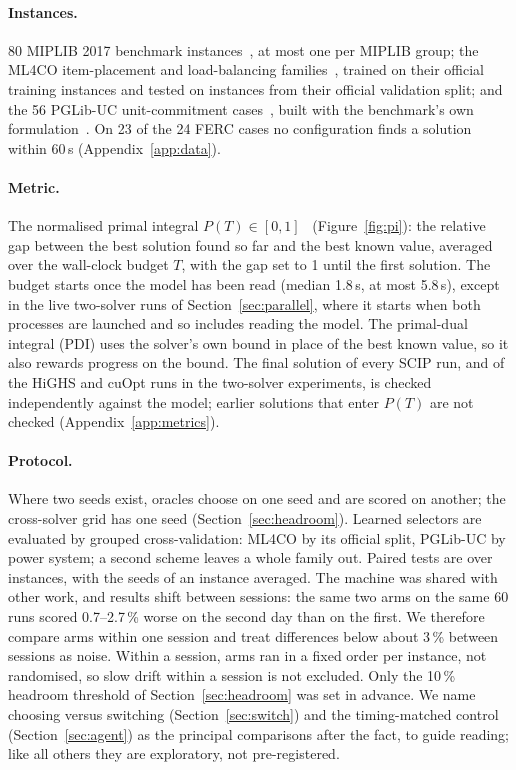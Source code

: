 \documentclass[11pt]{article}
\begin{document}
\paragraph{Instances.} 80 MIPLIB 2017 benchmark instances~\citep{gleixner2021miplib}, at most one per MIPLIB group;
the ML4CO item-placement and load-balancing families~\citep{gasse2022ml4co}, trained on their official training
instances and tested on instances from their official validation split; and the 56 PGLib-UC unit-commitment
cases~\citep{pglibuc}, built with the benchmark's own formulation~\citep{knueven2020uc}. On 23 of the 24 FERC cases no
configuration finds a solution within 60\,s (Appendix~\ref{app:data}).
\paragraph{Metric.} The normalised primal integral $P(T)\in[0,1]$~\citep{berthold2013primal} (Figure~\ref{fig:pi}):
the relative gap between the best solution found so far and the best known value, averaged over the wall-clock budget
$T$, with the gap set to 1 until the first solution. The budget starts once the model has been read (median 1.8\,s,
at most 5.8\,s), except in the live two-solver runs of Section~\ref{sec:parallel}, where it starts when both processes
are launched and so includes reading the model. The primal-dual integral (PDI) uses the solver's own bound in place of the best known value, so it
also rewards progress on the bound. The final solution of every SCIP run, and of the HiGHS and cuOpt runs in the
two-solver experiments, is checked independently against the model; earlier solutions that enter $P(T)$ are not
checked (Appendix~\ref{app:metrics}).
\paragraph{Protocol.} Where two seeds exist, oracles choose on one seed and are scored on another; the cross-solver
grid has one seed (Section~\ref{sec:headroom}). Learned selectors are evaluated by grouped
cross-validation: ML4CO by its official split, PGLib-UC by power system; a second scheme leaves a whole family out.
Paired tests are over instances, with the seeds of an instance averaged. The machine was shared with other work, and
results shift between sessions: the same two arms on the same 60 runs scored 0.7--2.7\,\% worse on the second day than
on the first. We therefore compare arms within one session and treat differences below about 3\,\% between sessions
as noise. Within a session, arms ran in a fixed order per instance, not randomised, so slow drift within a session is
not excluded. Only the 10\,\% headroom threshold of Section~\ref{sec:headroom} was set in advance. We name choosing
versus switching (Section~\ref{sec:switch}) and the timing-matched control (Section~\ref{sec:agent}) as the principal
comparisons after the fact, to guide reading; like all others they are exploratory, not pre-registered.
\end{document}
